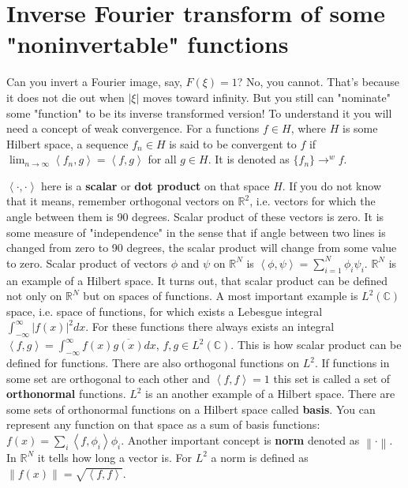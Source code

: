 \documentclass[a4paper,11pt,fleqn]{article}
\begin{document}
\section {Inverse Fourier transform of some "noninvertable" functions}
Can you invert a Fourier image, say, $F(\xi)=1$? No, you cannot. That's because it does not die out when $\left|\xi\right|$
moves toward infinity. But you still can "nominate" some "function" to be its inverse transformed version! To understand it
you will need a concept of weak convergence. For a functions $f \in H$, where $H$ is some Hilbert space, a sequence $f_{n} \in H$
is said to be convergent to $f$ if $\lim_{n \to \infty} \left<f_{n},g\right> = \left<f,g\right>$ for all $g \in H$. It is denoted as
$\{f_{n}\} \to^{w} f$.

 $\left<\cdot, \cdot\right>$ here is a \textbf{scalar} or \textbf{dot product} on that space $H$. If you do not
know that it means, remember orthogonal vectors on $\mathbb{R}^{2}$, i.e. vectors for which the angle between them is 90 degrees. Scalar product
of these vectors is zero. It is some measure of "independence" in the sense that if angle between two lines is changed from zero to 90 degrees, the
scalar product will change from some value to zero. Scalar product of vectors $\phi$ and $\psi$ on $\mathbb{R}^{N}$ is 
$\left<\phi,\psi\right> = \sum_{i=1}^{N} \phi_{i}\psi_{i}$. $\mathbb{R}^{N}$ is an example of a Hilbert space. It turns out, that scalar product
can be defined not only on $\mathbb{R}^{N}$ but on spaces of functions. A most important example is $L^{2}(\mathbb{C})$ space, i.e. space of functions,
for which exists a Lebesgue integral $\int_{-\infty}^{\infty} {\left|f(x)\right|}^{2} dx$. For these functions there always exists an integral
$\left<f,g\right> = \int_{-\infty}^{\infty} f(x)\overline{g(x)}dx$, $f,g \in L^{2}(\mathbb{C})$. This is how scalar product can be defined for functions.
There are also orthogonal functions on $L^2$. If functions in some set are orthogonal to each other and $\left<f,f\right> = 1$ this set is called a set
of \textbf{orthonormal} functions. $L^2$ is an another example of a Hilbert space. There are some sets of orthonormal functions on a Hilbert space called
\textbf{basis}. You can represent any function on that space as a sum of basis functions: $f(x) = \sum_{i}\left<f,\phi_{i}\right>\phi_{i}$. Another important
concept is \textbf{norm} denoted as $\left\lVert\cdot\right\rVert$. In $\mathbb{R}^{N}$ it tells how long a vector is. For $L^2$ a norm is defined as 
$\left\lVert f(x) \right\rVert  = \sqrt{\left<f,f\right>}$.
\end{document}
